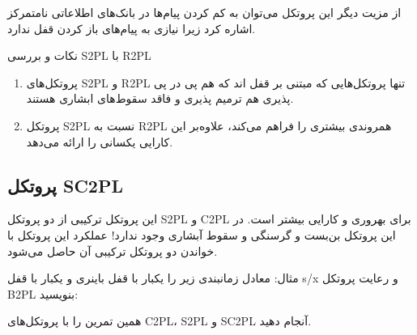 \documentclass[a4paper]{article}
\begin{document}
از مزیت دیگر این پروتکل می‌توان به کم کردن پیام‌ها در بانک‌های اطلاعاتی نامتمرکز
اشاره کرد زیرا نیازی به پیام‌های باز کردن قفل ندارد.

\begin{LTR}
    \begin{table}[h]
        \begin{RTL}
            \caption{زمانبندی $S_{8}$}
        \end{RTL}
        \centering
    \end{table}
\end{LTR}

نکات و بررسی S2PL با R2PL

\begin{enumerate}
    \item پروتکل‌های S2PL و R2PL تنها پروتکل‌هایی که مبتنی بر قفل اند که هم پی
    در پی پذیری هم ترمیم پذیری و فاقد سقوط‌های ابشاری هستند.
    \item پروتکل S2PL نسبت به R2PL همروندی بیشتری را فراهم می‌کند، علاوه‌بر این
    کارایی یکسانی را ارائه می‌دهد.
\end{enumerate}

\subsection{پروتکل SC2PL}

این پروتکل ترکیبی از دو پروتکل S2PL و C2PL برای بهروری و کارایی بیشتر است. در
این پروتکل بن‌بست و گرسنگی و سقوط آبشاری وجود ندارد! عملکرد این پروتکل با خواندن
دو پروتکل ترکیبی آن حاصل می‌شود.

\begin{LTR}
    \begin{table}[h]
        \begin{RTL}
            \caption{زمانبندی $S_{9}$}
        \end{RTL}
        \centering
    \end{table}
\end{LTR}

\newpage

مثال: معادل زمانبندی زیر را یکبار با قفل باینری و یکبار با قفل s/x و رعایت
پروتکل B2PL بنویسید:


همین تمرین را با پروتکل‌های C2PL، S2PL و SC2PL آنجام دهید.
\end{document}

